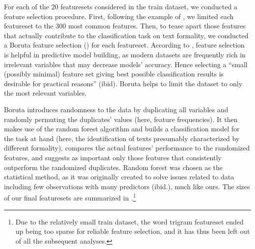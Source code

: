 \documentclass[output=paper]{langscibook}
\begin{document}
For each of the 20 featuresets considered in the train dataset, we conducted a feature selection procedure. First, following the example of \citet{VolanskyEtAl2015}, we limited each featureset to the 300 most common features. Then, to tease apart those features that actually contribute to the classification task on text formality, we conducted a Boruta feature selection (\citealt{KursaRudnicki2010}) for each featureset. According to \citet{KursaRudnicki2010}, feature selection is helpful in predictive model building, as modern datasets are frequently rich in irrelevant variables that may decrease models’ accuracy. Hence selecting a “small (possibly minimal) feature set giving best possible classification results is desirable for practical reasons” (ibid). Boruta helps to limit the dataset to only the most relevant variables.

Boruta introduces randomness to the data by duplicating all variables and randomly permuting the duplicates’ values (here, feature frequencies). It then makes use of the random forest algorithm \citep{Breiman2001} and builds a classification model for the task at hand (here, the identification of texts presumably characterized by different formality), compares the actual features’ performance to the randomized features, and suggests as important only those features that consistently outperform the randomized duplicates. Random forest was chosen as the statistical method, as it was originally created to solve issues related to data including few observations with many predictors (ibid.), much like ours. The sizes of our final featuresets are summarized in .\footnote{Due to the relatively small train dataset, the word trigram featureset ended up being too sparse for reliable feature selection, and it has thus been left out of all the subsequent analyses.}
\end{document}
